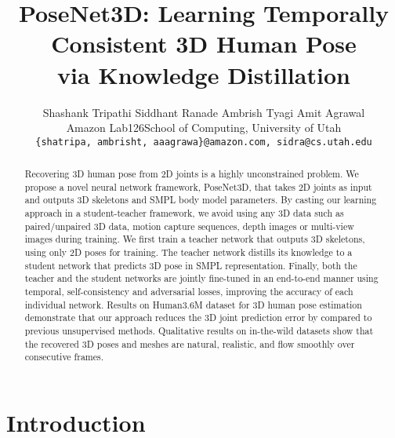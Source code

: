 \documentclass[10pt,twocolumn,letterpaper]{article}
\begin{document}
\title{\vspace{-5ex}PoseNet3D: Learning Temporally Consistent 3D Human Pose\\ via Knowledge Distillation}

\author{Shashank Tripathi \quad Siddhant Ranade \quad Ambrish Tyagi \quad Amit Agrawal\\
	Amazon Lab126\quad School of Computing, University of Utah\\
\tt\small \{shatripa, ambrisht, aaagrawa\}@amazon.com, sidra@cs.utah.edu}

\maketitle

\renewcommand*{\thefootnote}{}
\setcounter{footnote}{1}

\begin{abstract}





Recovering 3D human pose from 2D joints is a highly unconstrained problem. We propose a novel neural network framework, PoseNet3D, that takes 2D joints as input and outputs 3D skeletons and SMPL body model parameters. By casting our learning approach in a student-teacher framework, we avoid using any 3D data such as paired/unpaired 3D data, motion capture sequences, depth images or multi-view images during training. We first train a teacher network that outputs 3D skeletons, using only 2D poses for training. 
The teacher network distills its knowledge to a student network that predicts 3D pose in SMPL representation. Finally, both the teacher and the student networks are jointly fine-tuned in an end-to-end manner using temporal, self-consistency and adversarial losses, improving the accuracy of each individual network. 
Results on Human3.6M dataset for 3D human pose estimation demonstrate that our approach reduces the 3D joint prediction error by  compared to previous unsupervised methods. Qualitative results on in-the-wild datasets show that the recovered 3D poses and meshes are natural, realistic, and flow smoothly over consecutive frames. 








\end{abstract}


 
\section{Introduction}
\end{document}
